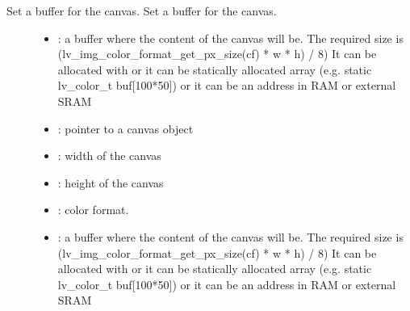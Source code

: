 \documentclass[letterpaper,10pt,english]{sphinxmanual}
\begin{document}
\begin{fulllineitems}
\label{\detokenize{object-types/canvas:_CPPv420lv_canvas_set_bufferP8lv_obj_tPv10lv_coord_t10lv_coord_t11lv_img_cf_t}}%
\pysigstartmultiline
{}\label{\detokenize{object-types/canvas:lv__canvas_8h_1a65cfb1d41e6908f15f7463dfb3980cec}}%
\pysigstopmultiline
Set a buffer for the canvas. 
Set a buffer for the canvas. 
\begin{description}
\item[{}] \leavevmode\begin{itemize}
\item {} 
: a buffer where the content of the canvas will be. The required size is (lv\_img\_color\_format\_get\_px\_size(cf) * w * h) / 8) It can be allocated with  or it can be statically allocated array (e.g. static lv\_color\_t buf{[}100*50{]}) or it can be an address in RAM or external SRAM 

\item {} 
: pointer to a canvas object 

\item {} 
: width of the canvas 

\item {} 
: height of the canvas 

\item {} 
: color format. 

\end{itemize}

\item[{}] \leavevmode\begin{itemize}
\item {} 
: a buffer where the content of the canvas will be. The required size is (lv\_img\_color\_format\_get\_px\_size(cf) * w * h) / 8) It can be allocated with  or it can be statically allocated array (e.g. static lv\_color\_t buf{[}100*50{]}) or it can be an address in RAM or external SRAM 


\end{itemize}
\end{description}
\end{fulllineitems}
\end{document}
